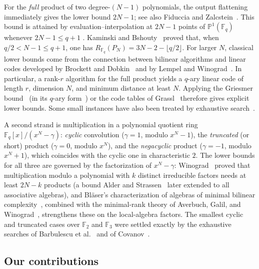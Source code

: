 \documentclass[11pt]{article}
\theoremstyle{definition}
\newcommand{\F}{\mathbb{F}}
\begin{document}
For the \emph{full} product of two degree-$(N-1)$ polynomials, the
output flattening immediately gives the lower bound $2N-1$; see also
Fiduccia and Zalcstein~\cite{fiduccia1977algebras}. This bound is attained
by evaluation--interpolation at $2N-1$ points of
$\mathbb{P}^1(\F_q)$ whenever $2N-1\le q+1$
\cite{toom1963complexity,kaminski1989multiplicative}.
Kaminski and Bshouty~\cite{kaminski1989multiplicative} proved that, when
$q/2<N-1\le q+1$, one has $ R_{\mathbb F_q}(P_N) = 3N-2-\lfloor q/2 \rfloor$.
For larger $N$, classical lower bounds come from the connection between
bilinear algorithms and linear codes developed by Brockett and
Dobkin~\cite{brockett1978optimal} and by Lempel and
Winograd~\cite{lempel1977new}. In particular, a rank-$r$ algorithm for
the full product yields a $q$-ary linear code of length $r$, dimension
$N$, and minimum distance at least $N$. Applying the Griesmer
bound~\cite{griesmer1960bound} (in its $q$-ary
form~\cite{solomon1965algebraically}) or the code tables of
Grassl~\cite{grassl2007codetables} therefore gives explicit lower
bounds. Some small instances have also been treated by exhaustive
search~\cite{barbulescu2012finding}.

A second strand is multiplication in a polynomial quotient ring
$\F_q[x]/(x^N-\gamma)$: \emph{cyclic} convolution ($\gamma=1$, modulo $x^N-1$),
the \emph{truncated} (or short) product ($\gamma=0$, modulo $x^N$), and the
\emph{negacyclic} product ($\gamma=-1$, modulo $x^N+1$), which coincides with the
cyclic one in characteristic $2$. The lower bounds for all three are governed by
the factorization of $x^N-\gamma$: Winograd~\cite{winograd1977some} proved that
multiplication modulo a polynomial with $k$ distinct irreducible factors needs at
least $2N-k$ products (a bound Alder and
Strassen~\cite{alder1981algorithmic} later extended to all associative algebras),
and Bl\"aser's characterization of algebras of minimal bilinear
complexity~\cite{blaser2005complete}, combined with the minimal-rank theory of
Averbuch, Galil, and
Winograd~\cite{averbuch1988classification,averbuch1991classification},
strengthens these on the local-algebra factors. The smallest cyclic and
truncated cases over $\F_2$ and $\F_3$ were settled exactly by the exhaustive
searches of Barbulescu et al.~\cite{barbulescu2012finding} and of
Covanov~\cite{covanov2019improved}.

\subsection{Our contributions}
\end{document}
